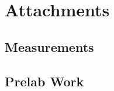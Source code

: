 \documentclass[12pt]{article}
\begin{document}
\section{Attachments}
\subsection{Measurements}
\subsection{Prelab Work}

\end{document}

